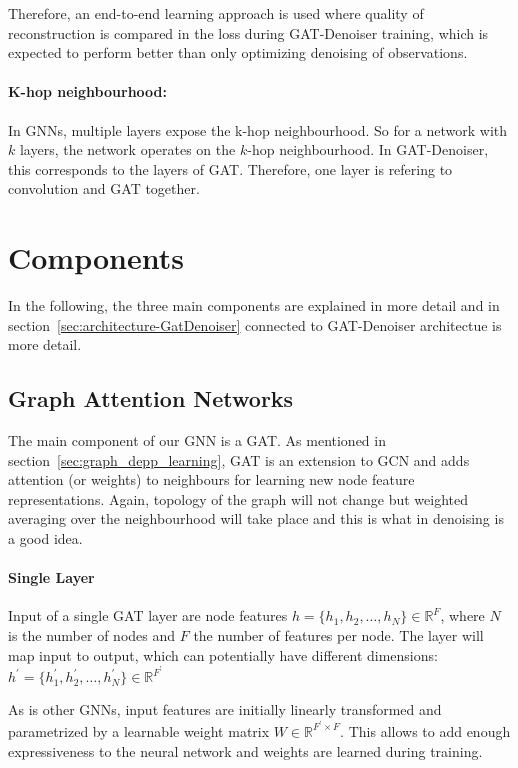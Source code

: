 Therefore, an end-to-end learning approach is used where quality of reconstruction is 
compared in the loss during GAT-Denoiser training, which is expected to perform better than 
only optimizing denoising of observations.


\paragraph{K-hop neighbourhood:}
In GNNs, multiple layers expose the k-hop neighbourhood. So for a network with $k$ layers,
the network operates on the $k$-hop neighbourhood. In GAT-Denoiser, this corresponds
to the layers of GAT. Therefore, one layer is refering to convolution and GAT together.

\section{Components}
In the following, the three main components are explained in more detail
and in section~\ref{sec:architecture-GatDenoiser} connected to GAT-Denoiser architectue is more detail.

\subsection{Graph Attention Networks}
The main component of our GNN is a GAT.
As mentioned in section~\ref{sec:graph_depp_learning}, GAT is an extension to GCN and 
adds attention (or weights) to neighbours for learning new node feature representations. 
Again, topology of the graph will not change but weighted averaging over the neighbourhood 
will take place and this is what in denoising is a good idea.

\paragraph{Single Layer}
Input of a single GAT layer are node features $h = \{ h_1, h_2, \dots , h_N \} \in \mathbb{R}^F$, 
where $N$ is the number of nodes and $F$ the number of features per node. 
The layer will map input to output, which can potentially have different dimensions: 
$h^{\prime} = \{ h_1^{\prime}, h_2^{\prime}, \dots, h_N^{\prime} \} \in \mathbb{R}^{F^{\prime}} $

As is other GNNs, input features are initially 
linearly transformed and parametrized by a learnable weight matrix $W \in \mathbb{R}^{F^{\prime} \times F}$.
This allows to add enough expressiveness to the neural network and weights are learned during training.

